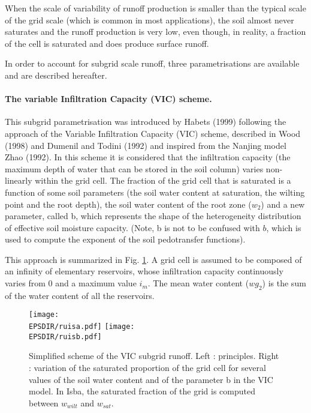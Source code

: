 When the scale of variability of runoff production is smaller than the typical scale
of the grid scale (which is common in most applications), the soil almost never 
saturates and the runoff production is very low, even though, in reality, 
a fraction of the cell is saturated and does produce surface
runoff.

In order to account for subgrid scale runoff, three parametrisations are available and
are described hereafter.

 
\paragraph{The variable Infiltration Capacity (VIC) scheme.}    
%
This subgrid parametrisation was introduced by Habets \etal (1999)\nocite{Habets1999} 
following the approach of the Variable Infiltration Capacity (VIC) scheme,
described in Wood \etal (1998)\nocite{Wood1998} and Dumenil and Todini (1992)\nocite{Dumenil1992} and inspired from the
Nanjing model Zhao (1992)\nocite{Zhao1992}.
In this scheme it is considered that the infiltration capacity (the maximum depth of
water that can be stored in the soil column) varies non-linearly within the grid cell.
The fraction of the grid cell that is saturated is a function of some soil parameters (the
soil water content at saturation, the wilting point and the root depth), the soil water
content of the root zone ($w_2$) and a new parameter, called b, which represents the
shape of the heterogeneity distribution of effective soil moisture
capacity. 
(Note, b is not to be confused with $b$, which is used to compute the
exponent of the soil pedotransfer functions).

This approach is summarized in Fig. \ref{fig:vic}. A grid cell is assumed to be composed of 
an infinity of elementary reservoirs, whose infiltration capacity continuously varies
from 0 and a maximum value $i_m$. The mean water content ($wg_2$) is the sum of
the water content of all the reservoirs.

\begin{figure}[!b]
\centerline{
\texttt{[image: \\EPSDIR/ruisa.pdf]}
\texttt{[image: \\EPSDIR/ruisb.pdf]}}
\caption{
Simplified scheme of the VIC subgrid runoff.
Left : principles. Right : variation of the saturated proportion of
the grid cell for several values of the soil water content and of the
parameter b in the VIC model. In Isba, the saturated fraction of the
grid is computed between $w_{wilt}$ and $w_{sat}$.
}
\label{fig:vic}
\end{figure}

